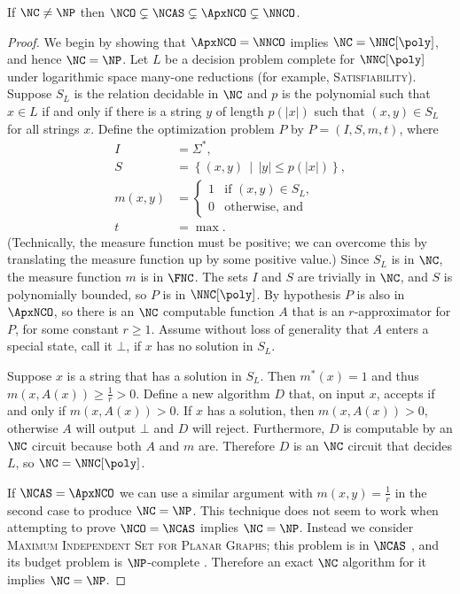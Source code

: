 \begin{theorem}\label{thm:hierarchy}
  If $\NC \neq \NP$ then $\NCO \subsetneq \NCAS \subsetneq \ApxNCO \subsetneq \NNCO$.
\end{theorem}
\begin{proof}
  We begin by showing that $\ApxNCO = \NNCO$ implies $\NC = \NNC[\poly]$, and hence $\NC = \NP$.
  Let $L$ be a decision problem complete for $\NNC[\poly]$ under logarithmic space many-one reductions (for example, \textsc{Satisfiability}).
  Suppose $S_L$ is the relation decidable in $\NC$ and $p$ is the polynomial such that $x \in L$ if and only if there is a string $y$ of length $p(|x|)$ such that $(x, y) \in S_L$ for all strings $x$.
  Define the optimization problem $P$ by $P = (I, S, m, t)$, where
  \begin{align*}
    I & = \Sigma^*, \\
    S & = \left\{ (x, y) \,\middle|\, |y| \leq p(|x|) \right\}, \\
    m(x, y) & =
    \begin{cases}
      1 & \text{if } (x, y) \in S_L, \\
      0 & \text{otherwise, and}
    \end{cases} \\
    t & = \max.
  \end{align*}
  (Technically, the measure function must be positive; we can overcome this by translating the measure function up by some positive value.)
  Since $S_L$ is in $\NC$, the measure function $m$ is in $\FNC$.
  The sets $I$ and $S$ are trivially in $\NC$, and $S$ is polynomially bounded, so $P$ is in $\NNC[\poly]$.
  By hypothesis $P$ is also in $\ApxNCO$, so there is an $\NC$ computable function $A$ that is an $r$-approximator for $P$, for some constant $r \geq 1$.
  Assume without loss of generality that $A$ enters a special state, call it $\bot$, if $x$ has no solution in $S_L$.

  Suppose $x$ is a string that has a solution in $S_L$.
  Then $m^*(x) = 1$ and thus $m(x, A(x)) \geq \frac{1}{r} > 0$.
  Define a new algorithm $D$ that, on input $x$, accepts if and only if $m(x, A(x)) > 0$.
  If $x$ has a solution, then $m(x, A(x)) > 0$, otherwise $A$ will output $\bot$ and $D$ will reject.
  Furthermore, $D$ is computable by an $\NC$ circuit because both $A$ and $m$ are.
  Therefore $D$ is an $\NC$ circuit that decides $L$, so $\NC = \NNC[\poly]$.

  If $\NCAS = \ApxNCO$ we can use a similar argument with $m(x, y) = \frac{1}{r}$ in the second case to produce $\NC = \NP$.
  This technique does not seem to work when attempting to prove $\NCO = \NCAS$ implies $\NC = \NP$.
  Instead we consider \textsc{Maximum Independent Set for Planar Graphs}; this problem is in $\NCAS$ \cite[Theorem~5.2.1]{dsst97}, and its budget problem is $\NP$-complete \cite{gj79}.
  Therefore an exact $\NC$ algorithm for it implies $\NC = \NP$.
\end{proof}


